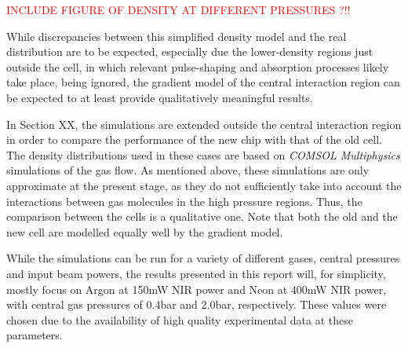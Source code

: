 \documentclass[a4paper]{jpconf}
\begin{document}
\textcolor{red}{INCLUDE FIGURE OF DENSITY AT DIFFERENT PRESSURES ?!!} \par 
While discrepancies between this simplified density model and the real distribution are to be expected, especially due the lower-density regions just outside the cell, in which relevant pulse-shaping and absorption processes likely take place, being ignored, the gradient model of the central interaction region can be expected to at least provide qualitatively meaningful results. \par 
In Section XX, the simulations are extended outside the central interaction region in order to compare the performance of the new chip with that of the old cell. The density distributions used in these cases are based on \textit{COMSOL Multiphysics} simulations of the gas flow. As mentioned above, these simulations are only approximate at the present stage, as they do not sufficiently take into account the interactions between gas molecules in the high pressure regions. Thus, the comparison between the cells is a qualitative one. Note that both the old and the new cell are modelled equally well by the gradient model. \par 
While the simulations can be run for a variety of different gases, central pressures and input beam powers, the results presented in this report will, for simplicity, mostly focus on Argon at 150mW NIR power and Neon at 400mW NIR power, with central gas pressures of 0.4bar and 2.0bar, respectively. These values were chosen due to the availability of high quality experimental data at these parameters. 
\end{document}
